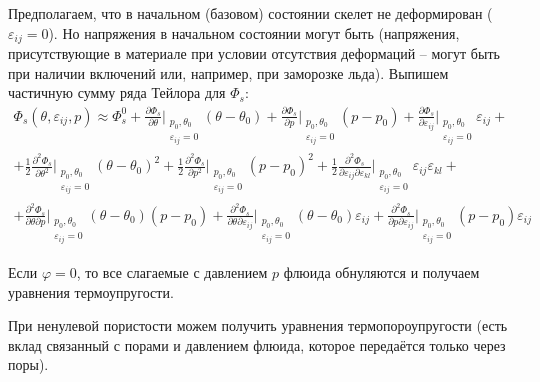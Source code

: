 \documentclass[main.tex]{subfiles}
\begin{document}
Предполагаем, что в начальном (базовом) состоянии скелет не деформирован ($\varepsilon_{ij}=0$). Но напряжения в начальном состоянии могут быть (напряжения, присутствующие в материале при условии отсутствия деформаций -- могут быть при наличии включений или, например, при заморозке льда). Выпишем частичную сумму ряда Тейлора для $\Phi_s$:
\begin{multline}\label{PhiSTaylor}
\Phi_s\left(\theta,\varepsilon_{ij},p\right)\approx\Phi_{s}^0+\frac{\partial\Phi_s}{\partial\theta}\bigg|_{\substack{p_0,\theta_0\\\varepsilon_{ij}=0}}\left(\theta-\theta_0\right)+\frac{\partial\Phi_s}{\partial p}\bigg|_{\substack{p_0,\theta_0\\\varepsilon_{ij}=0}}\left(p-p_0\right)+\frac{\partial\Phi_s}{\partial\varepsilon_{ij}}\bigg|_{\substack{p_0,\theta_0\\\varepsilon_{ij}=0}}\varepsilon_{ij}+\\+\frac{1}{2}\frac{\partial^2\Phi_s}{\partial\theta^2}\bigg|_{\substack{p_0,\theta_0\\\varepsilon_{ij}=0}}\left(\theta-\theta_0\right)^2+\frac{1}{2}\frac{\partial^2\Phi_s}{\partial p^2}\bigg|_{\substack{p_0,\theta_0\\\varepsilon_{ij}=0}}\left(p-p_0\right)^2+\frac{1}{2}\frac{\partial^2\Phi_s}{\partial\varepsilon_{ij}\partial\varepsilon_{kl}}\bigg|_{\substack{p_0,\theta_0\\\varepsilon_{ij}=0}}\varepsilon_{ij}\varepsilon_{kl}+\\+\frac{\partial^2\Phi_s}{\partial\theta\partial p}\bigg|_{\substack{p_0,\theta_0\\\varepsilon_{ij}=0}}\left(\theta-\theta_0\right)\left(p-p_0\right)+\frac{\partial^2\Phi_s}{\partial\theta\partial\varepsilon_{ij}}\bigg|_{\substack{p_0,\theta_0\\\varepsilon_{ij}=0}}\left(\theta-\theta_0\right)\varepsilon_{ij}+\frac{\partial^2\Phi_s}{\partial p\partial\varepsilon_{ij}}\bigg|_{\substack{p_0,\theta_0\\\varepsilon_{ij}=0}}\left(p-p_0\right)\varepsilon_{ij}
\end{multline}

Если $\varphi=0$, то все слагаемые с давлением $p$ флюида обнуляются и получаем уравнения термоупругости.

При ненулевой пористости можем получить уравнения термопороупругости (есть вклад связанный с порами и давлением флюида, которое передаётся только через поры).
\end{document}
